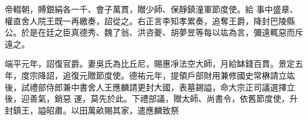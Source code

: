 \begin{pinyinscope}
 帝輟朝，賻銀絹各一千、會子萬貫，贈少師、保靜鎮潼軍節度使。給
 事中盛章、權直舍人院王既一再繳奏，詔從之。右正言李知孝累奏，追奪王爵，降封巴陵縣公。於是在廷之臣真德秀、魏了翁、洪咨夔、胡夢昱等每以竑為言，彌遠輒惡而斥遠之。



 端平元年，詔復官爵。妻吳氏為比丘尼，賜惠凈法空大師，月給缽錢百貫。景定五年，度宗降詔，追復元贈節度使。德祐元年，提領戶部財用兼修國史常楙請立竑後，試禮部侍郎兼中書舍人王應麟請更封大國，表墓錫謚，命大宗正司議選擇立後，迎善氣，銷惡
 運，莫先於此。下禮部議，贈太師、尚書令，依舊節度使，升封鎮王，謚昭肅。以田萬畝賜其家，遣應麟致祭



\end{pinyinscope}